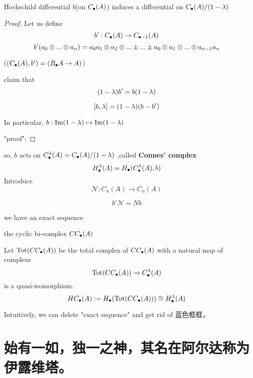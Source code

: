 \begin{prop}
Hochschild differential $b$(on $C_{\bullet}(A)$) induces a
differential on $C_{\bullet}(A)/(1-\lambda)$
\end{prop}
\begin{proof}
Let us define
$$b':C_{\bullet}(A)\to C_{\bullet-1}(A)$$
$$b'(a_0\otimes...\otimes a_n)
=a_0a_1\otimes a_2\otimes...\pm...\pm a_0\otimes a_1\otimes...\otimes a_{n-1}a_n$$

(($C_{\bullet}(A),b')=(B_{\bullet} A\to A)$)

claim that
$$(1-\lambda)b'=b(1-\lambda)$$

$$[b,\lambda]=(1-\lambda)(b-b')$$

In particular, $b:\operatorname{Im}(1-\lambda)\mapsto\operatorname{Im}(1-\lambda)$

"proof":


\end{proof}

so, $b$ acts on $C^{\lambda}_{\bullet}(A)=C_{\bullet}(A)/(1-\lambda)$
,called \textbf{Connes' complex}
$$H^{\lambda}_{\bullet}(A)=H_{\bullet}(C^{\lambda}_{\bullet}(A),b)$$
Introduce
$$\mathcal{N}:C_n(A)\to C_n(A)$$

\begin{prop}
$$b'\mathcal{N}=Nb$$
\end{prop}

we have an exact sequence

\begin{definition}
the cyclic bi-complex $CC_{\bullet}(A)$
\end{definition}

Let $\text{Tot}(CC_{\bullet}(A))$ be the total complex of $CC_{\bullet}(A)$
with a natural map of complexs
$$\text{Tot}(CC_{\bullet}(A))\to C^{\lambda}_{\bullet}(A)$$
is a quasi-isomorphism.
$$HC_{\bullet}(A):=H_{\bullet}(\text{Tot}(CC_{\bullet}(A)))
\cong H^{\lambda}_{\bullet}(A)$$

Intuitively, we can delete "exact sequence" and get rid of 蓝色框框，

\section{始有一如，独一之神，其名在阿尔达称为伊露维塔。}








